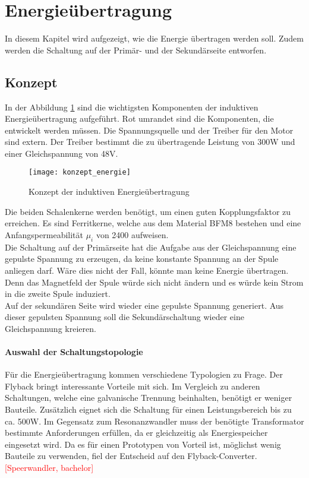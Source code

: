\section{Energieübertragung}\label{sec:energie}
In diesem Kapitel wird aufgezeigt, wie die Energie übertragen werden soll. Zudem werden die Schaltung auf der Primär- und der Sekundärseite entworfen.

\subsection{Konzept}
In der Abbildung \ref{fig:konzept_energie} sind die wichtigsten Komponenten der induktiven Energieübertragung aufgeführt. Rot umrandet sind die Komponenten, die entwickelt werden müssen. Die Spannungsquelle und der Treiber für den Motor sind extern. Der Treiber bestimmt die zu übertragende Leistung von 300W und einer Gleichspannung von 48V.

\begin{figure}[h]
	\centering
	\texttt{[image: konzept\_energie]}
	\caption{Konzept der induktiven Energieübertragung}\label{fig:konzept_energie}
\end{figure}

Die beiden Schalenkerne werden benötigt, um einen guten Kopplungsfaktor zu erreichen. Es sind Ferritkerne, welche aus dem Material BFM8 bestehen und eine Anfangspermeabilität $ \mu_{i} $ von 2400 aufweisen.\\ Die Schaltung auf der Primärseite hat die Aufgabe aus der Gleichspannung eine gepulste Spannung zu erzeugen, da keine konstante Spannung an der Spule anliegen darf. Wäre dies nicht der Fall, könnte man keine Energie übertragen. Denn das Magnetfeld der Spule würde sich nicht ändern und es würde kein Strom in die zweite Spule induziert. \\
Auf der sekundären Seite wird wieder eine gepulste Spannung generiert. Aus dieser gepulsten Spannung soll die Sekundärschaltung wieder eine Gleichspannung kreieren.

\paragraph{Auswahl der Schaltungstopologie}
Für die Energieübertragung kommen verschiedene Typologien zu Frage. Der Flyback bringt interessante Vorteile mit sich. Im Vergleich zu anderen Schaltungen, welche eine galvanische Trennung beinhalten, benötigt er weniger Bauteile. Zusätzlich eignet sich die Schaltung für einen Leistungsbereich bis zu ca. 500W. Im Gegensatz zum Resonanzwandler muss der benötigte Transformator bestimmte Anforderungen erfüllen, da er gleichzeitig als Energiespeicher eingesetzt wird. Da es für einen Prototypen von Vorteil ist, möglichst wenig Bauteile zu verwenden, fiel der Entscheid auf den Flyback-Converter.\textcolor{red}{[Speerwandler, bachelor]}

